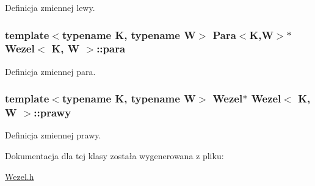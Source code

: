 \-Definicja zmiennej lewy. 

\hypertarget{class_wezel_a4ce56c464874565cc027ce9660cf8e25}{
\subsubsection[{para}]{\setlength{\rightskip}{0pt plus 5cm}template$<$typename \-K, typename \-W$>$ {\bf \-Para}$<$\-K,\-W$>$$\ast$ {\bf \-Wezel}$<$ \-K, \-W $>$\-::{\bf para}}}\label{class_wezel_a4ce56c464874565cc027ce9660cf8e25}


\-Definicja zmiennej para. 

\hypertarget{class_wezel_a5b54943e3c95535fbf59be020808e359}{
\subsubsection[{prawy}]{\setlength{\rightskip}{0pt plus 5cm}template$<$typename \-K, typename \-W$>$ {\bf \-Wezel}$\ast$ {\bf \-Wezel}$<$ \-K, \-W $>$\-::{\bf prawy}}}\label{class_wezel_a5b54943e3c95535fbf59be020808e359}


\-Definicja zmiennej prawy. 



\-Dokumentacja dla tej klasy została wygenerowana z pliku\-:\begin{DoxyCompactItemize}
\item 
\hyperlink{_wezel_8h}{\-Wezel.\-h}\end{DoxyCompactItemize}
